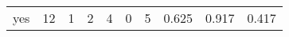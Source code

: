\begin{longtable}{lp{1.3cm}p{1.3cm}p{1.3cm}p{1.3cm}p{1.3cm}p{1.3cm}p{1.3cm}p{1.3cm}p{1.3cm}}
yes       &                     12 &                                             1 &                                            2 &                                           4 &                                            0 &                                          5 &                                0.625 &                                  0.917 &                                0.417 \\
\end{longtable}
